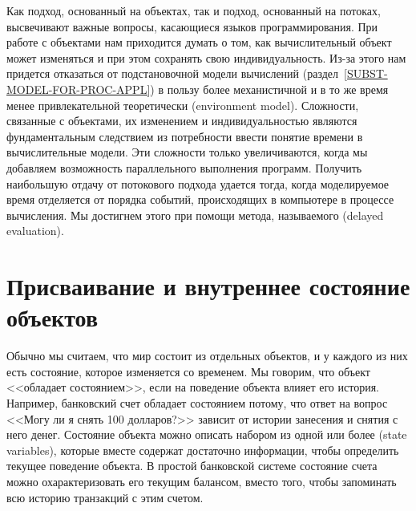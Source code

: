 Как подход, основанный на объектах, так и подход, основанный на
потоках, высвечивают важные вопросы, касающиеся языков
программирования.  При работе с объектами нам приходится думать о том,
как вычислительный объект может изменяться и при этом сохранять свою
индивидуальность. Из-за этого нам придется отказаться от подстановочной модели
вычислений (раздел~\ref{SUBST-MODEL-FOR-PROC-APPL}) в
пользу более механистичной и в то же время менее привлекательной
теоретически  (environment model).
Сложности, связанные с объектами, их изменением и индивидуальностью
являются фундаментальным следствием из потребности ввести понятие времени в вычислительные
модели.  Эти сложности только увеличиваются, когда мы добавляем
возможность параллельного выполнения программ.  Получить наибольшую
отдачу от потокового подхода удается тогда, когда
моделируемое время отделяется от порядка событий, происходящих в компьютере
в процессе вычисления.  Мы достигнем этого при помощи метода,
называемого  (delayed evaluation).

\section{Присваивание и внутреннее состояние объектов}
\label{ASSIGNMENT-AND-LOCAL-STATE}


Обычно мы считаем, что мир состоит из отдельных объектов, и у
каждого из них есть состояние, которое изменяется со временем.  Мы
говорим, что объект <<обладает состоянием>>, если на поведение объекта
влияет его история.  Например, банковский счет обладает состоянием
потому, что ответ на вопрос <<Могу ли я снять 100 долларов?>> зависит от
истории занесения и снятия с него денег.  Состояние объекта можно
описать набором из одной или более
 (state variables),
которые вместе содержат достаточно информации, чтобы определить
текущее поведение объекта.  В простой банковской системе состояние счета можно
охарактеризовать его текущим балансом, вместо того,
чтобы запоминать всю историю транзакций с этим счетом.

